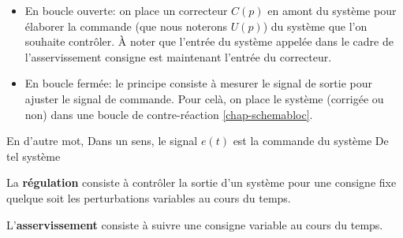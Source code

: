 \begin{itemize}
	\item En boucle ouverte: on place un correcteur $C(p)$
		en amont du système pour élaborer 
		la commande (que nous noterons $U(p)$) du système que l'on 
		souhaite contrôler. \`A noter que l'entrée du système appelée dans
		le cadre de l'asservissement consigne est maintenant 
		l'entrée du correcteur.

\begin{center}
\end{center}

\item En boucle fermée: le principe consiste à mesurer le signal de sortie
      pour ajuster le signal de commande. Pour celà, on place le
      système (corrigée ou non) dans une boucle de contre-réaction 
	  \cref{chap-schemabloc}.

\begin{center}
\end{center}

\end{itemize}

En d'autre mot, 
Dans un sens, le signal $e(t)$ est la commande du système 
De tel système



La \textbf{régulation} consiste à contrôler la sortie d'un système
pour une consigne fixe quelque soit les perturbations variables au 
cours du temps.

L'\textbf{asservissement} consiste à suivre une consigne variable 
au cours du temps.


